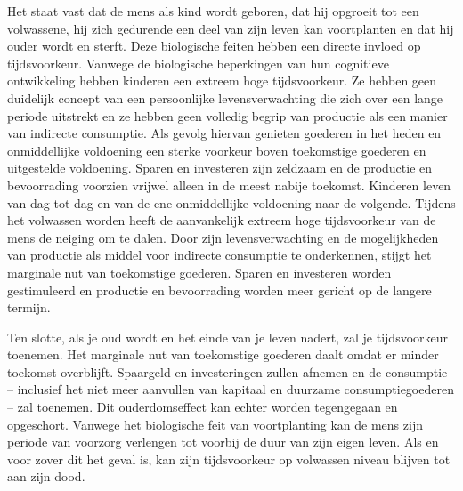 \begin{blockquotebox}
    Het staat vast dat de mens als kind wordt geboren, dat hij opgroeit tot een volwassene, hij zich gedurende een deel van zijn leven kan voortplanten en dat hij ouder wordt en sterft. Deze biologische feiten hebben een directe invloed op tijdsvoorkeur. Vanwege de biologische beperkingen van hun cognitieve ontwikkeling hebben kinderen een extreem hoge tijdsvoorkeur. Ze hebben geen duidelijk concept van een persoonlijke levensverwachting die zich over een lange periode uitstrekt en ze hebben geen volledig begrip van productie als een manier van indirecte consumptie. Als gevolg hiervan genieten goederen in het heden en onmiddellijke voldoening een sterke voorkeur boven toekomstige goederen en uitgestelde voldoening. Sparen en investeren zijn zeldzaam en de productie en bevoorrading voorzien vrijwel alleen in de meest nabije toekomst. Kinderen leven van dag tot dag en van de ene onmiddellijke voldoening naar de volgende. Tijdens het volwassen worden heeft de aanvankelijk extreem hoge tijdsvoorkeur van de mens de neiging om te dalen. Door zijn levensverwachting en de mogelijkheden van productie als middel voor indirecte consumptie te onderkennen, stijgt het marginale nut van toekomstige goederen. Sparen en investeren worden gestimuleerd en productie en bevoorrading worden meer gericht op de langere termijn.
    \par\vspace{1em}\noindent
    Ten slotte, als je oud wordt en het einde van je leven nadert, zal je tijdsvoorkeur toenemen. Het marginale nut van toekomstige goederen daalt omdat er minder toekomst overblijft. Spaargeld en investeringen zullen afnemen en de consumptie -- inclusief het niet meer aanvullen van kapitaal en duurzame consumptiegoederen -- zal toenemen. Dit ouderdomseffect kan echter worden tegengegaan en opgeschort. Vanwege het biologische feit van voortplanting kan de mens zijn periode van voorzorg verlengen tot voorbij de duur van zijn eigen leven. Als en voor zover dit het geval is, kan zijn tijdsvoorkeur op volwassen niveau blijven tot aan zijn dood.\footnotemark
\end{blockquotebox}

